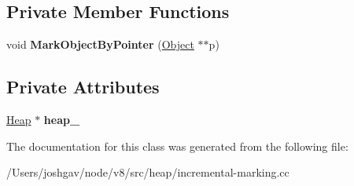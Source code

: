 \subsection*{Private Member Functions}
\begin{DoxyCompactItemize}
\item 
void {\bfseries Mark\+Object\+By\+Pointer} (\hyperlink{classv8_1_1internal_1_1_object}{Object} $\ast$$\ast$p)\hypertarget{classv8_1_1internal_1_1_incremental_marking_root_marking_visitor_afd21780773064aa0c6b51a1c484f6489}{}\label{classv8_1_1internal_1_1_incremental_marking_root_marking_visitor_afd21780773064aa0c6b51a1c484f6489}

\end{DoxyCompactItemize}
\subsection*{Private Attributes}
\begin{DoxyCompactItemize}
\item 
\hyperlink{classv8_1_1internal_1_1_heap}{Heap} $\ast$ {\bfseries heap\+\_\+}\hypertarget{classv8_1_1internal_1_1_incremental_marking_root_marking_visitor_af90f6314ab8bb18c389820e824b102db}{}\label{classv8_1_1internal_1_1_incremental_marking_root_marking_visitor_af90f6314ab8bb18c389820e824b102db}

\end{DoxyCompactItemize}


The documentation for this class was generated from the following file\+:\begin{DoxyCompactItemize}
\item 
/\+Users/joshgav/node/v8/src/heap/incremental-\/marking.\+cc\end{DoxyCompactItemize}
